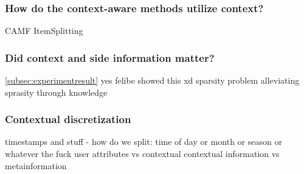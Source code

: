 
\subsubsection{How do the context-aware methods utilize context?}
CAMF 
ItemSplitting


\subsubsection{Did context and side information matter?}
\autoref{subsec:experimentresult}
yes felibe showed this xd
sparsity problem
alleviating sprasity through knowledge
\subsubsection{Contextual discretization}
timestamps and stuff - how do we split: time of day or month or season or whatever the fuck
user attributes vs contextual
contextual information vs metainformation
